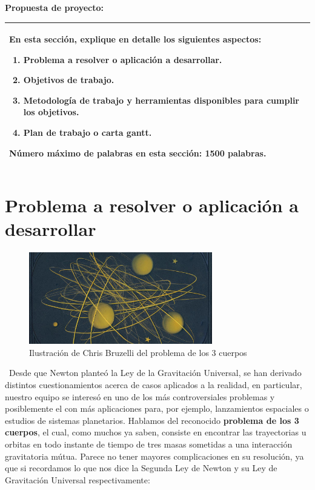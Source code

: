 \documentclass[proyecto.tex]{subfiles}
\begin{document}
\noindent\textbf{Propuesta de proyecto:}

\bigskip

\noindent\begin{tabularx}{\textwidth}{|>{\columncolor{tcc}}X|}
\hline
En esta sección, explique en detalle los siguientes aspectos:
\begin{enumerate}[label={\alph*)},nosep]
\item Problema a resolver o aplicación a desarrollar.
\item Objetivos de trabajo.
\item Metodología de trabajo y herramientas disponibles para cumplir los objetivos.
\item Plan de trabajo o carta gantt.
\end{enumerate}

\medskip

Número máximo de palabras en esta sección: \textbf{1500 palabras}.\\
\hline
\end{tabularx}

\section{Problema a resolver o aplicación a desarrollar}

\begin{figure}[h!]
    \centering
    \includegraphics[width=8cm]{articleImage-big.jpg}
    \caption{Ilustración de Chris Bruzelli del problema de los 3 cuerpos \cite{bruzelli}}
    \label{fig:bruzelli}
\end{figure}

\ Desde que Newton planteó la Ley de la Gravitación Universal, se han derivado distintos cuestionamientos acerca de casos aplicados a la realidad, en particular, nuestro equipo se interesó en uno de los más controversiales problemas y posiblemente el con más aplicaciones para, por ejemplo, lanzamientos espaciales o estudios de sistemas planetarios. Hablamos del reconocido \textbf{problema de los 3 cuerpos}, el cual, como muchos ya saben, consiste en encontrar las trayectorias u orbitas en todo instante de tiempo de tres masas sometidas a una interacción gravitatoria mútua. Parece no tener mayores complicaciones en su resolución, ya que si recordamos lo que nos dice la Segunda Ley de Newton y su Ley de Gravitación Universal respectivamente:
\end{document}

